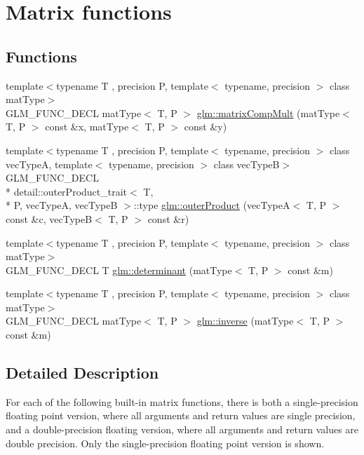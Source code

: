 \hypertarget{group__core__func__matrix}{\section{Matrix functions}
\label{group__core__func__matrix}
}
\subsection*{Functions}
\begin{DoxyCompactItemize}
\item 
{\footnotesize template$<$typename T , precision P, template$<$ typename, precision $>$ class mat\-Type$>$ }\\G\-L\-M\-\_\-\-F\-U\-N\-C\-\_\-\-D\-E\-C\-L mat\-Type$<$ T, P $>$ \hyperlink{group__core__func__matrix_ga4a54992e4741188ee624b21e3ba91814}{glm\-::matrix\-Comp\-Mult} (mat\-Type$<$ T, P $>$ const \&x, mat\-Type$<$ T, P $>$ const \&y)
\item 
{\footnotesize template$<$typename T , precision P, template$<$ typename, precision $>$ class vec\-Type\-A, template$<$ typename, precision $>$ class vec\-Type\-B$>$ }\\G\-L\-M\-\_\-\-F\-U\-N\-C\-\_\-\-D\-E\-C\-L \\*
detail\-::outer\-Product\-\_\-trait$<$ T, \\*
P, vec\-Type\-A, vec\-Type\-B $>$\-::type \hyperlink{group__core__func__matrix_gae9f513dc8e4f3ceb993669321b6d0f09}{glm\-::outer\-Product} (vec\-Type\-A$<$ T, P $>$ const \&c, vec\-Type\-B$<$ T, P $>$ const \&r)
\item 
{\footnotesize template$<$typename T , precision P, template$<$ typename, precision $>$ class mat\-Type$>$ }\\G\-L\-M\-\_\-\-F\-U\-N\-C\-\_\-\-D\-E\-C\-L T \hyperlink{group__core__func__matrix_ga26ea77c574802bc6fc193c40478718d2}{glm\-::determinant} (mat\-Type$<$ T, P $>$ const \&m)
\item 
{\footnotesize template$<$typename T , precision P, template$<$ typename, precision $>$ class mat\-Type$>$ }\\G\-L\-M\-\_\-\-F\-U\-N\-C\-\_\-\-D\-E\-C\-L mat\-Type$<$ T, P $>$ \hyperlink{group__core__func__matrix_ga7635d3dbe5aa10ff73a0e6903bf6bea5}{glm\-::inverse} (mat\-Type$<$ T, P $>$ const \&m)
\end{DoxyCompactItemize}


\subsection{Detailed Description}
For each of the following built-\/in matrix functions, there is both a single-\/precision floating point version, where all arguments and return values are single precision, and a double-\/precision floating version, where all arguments and return values are double precision. Only the single-\/precision floating point version is shown. 

